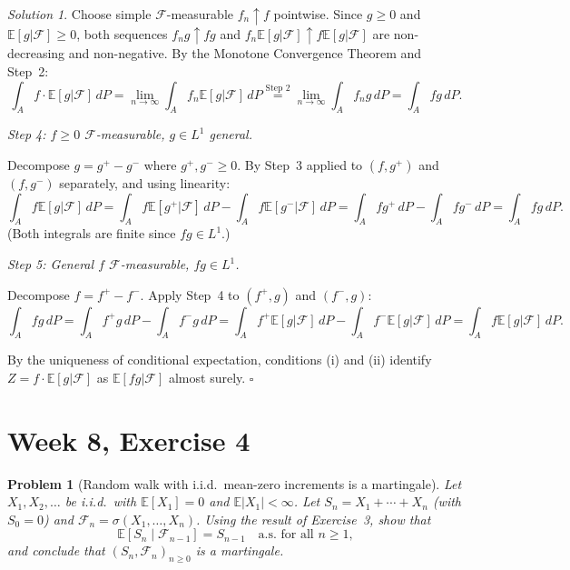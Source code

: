 \documentclass[12pt]{article}
\newtheorem{problem}{Problem}
\theoremstyle{remark}
\newtheorem*{solution}{Solution}
\newcommand{\E}{\mathbb{E}}
\newcommand{\F}{\mathcal{F}}
\newcommand{\1}{\mathbf{1}}
\begin{document}
\begin{solution}
Choose simple $\F$-measurable $f_n \uparrow f$ pointwise.  Since $g \ge 0$ and
$\E[g|\F] \ge 0$, both sequences $f_n g \uparrow fg$ and $f_n \E[g|\F] \uparrow f\E[g|\F]$
are non-decreasing and non-negative.  By the Monotone Convergence Theorem and Step~2:
\[
  \int_A f \cdot \E[g|\F]\,dP
  = \lim_{n\to\infty} \int_A f_n \E[g|\F]\,dP
  \overset{\text{Step }2}{=} \lim_{n\to\infty} \int_A f_n g\,dP
  = \int_A fg\,dP.
\]

\medskip
\noindent\textit{Step 4: $f \ge 0$ $\F$-measurable, $g \in L^1$ general.}

Decompose $g = g^+ - g^-$ where $g^+, g^- \ge 0$.  By Step~3 applied to $(f, g^+)$
and $(f, g^-)$ separately, and using linearity:
\[
  \int_A f \E[g|\F]\,dP
  = \int_A f \E[g^+|\F]\,dP - \int_A f \E[g^-|\F]\,dP
  = \int_A fg^+\,dP - \int_A fg^-\,dP
  = \int_A fg\,dP.
\]
(Both integrals are finite since $fg \in L^1$.)

\medskip
\noindent\textit{Step 5: General $f$ $\F$-measurable, $fg \in L^1$.}

Decompose $f = f^+ - f^-$.  Apply Step~4 to $(f^+, g)$ and $(f^-, g)$:
\[
  \int_A fg\,dP
  = \int_A f^+g\,dP - \int_A f^-g\,dP
  = \int_A f^+\E[g|\F]\,dP - \int_A f^-\E[g|\F]\,dP
  = \int_A f\E[g|\F]\,dP.
\]

By the uniqueness of conditional expectation, conditions (i) and (ii) identify
$Z = f \cdot \E[g|\F]$ as $\E[fg|\F]$ almost surely. \hfill$\square$
\end{solution}

\section*{Week 8, Exercise 4}

\begin{problem}[Random walk with i.i.d.\ mean-zero increments is a martingale]
\label{prob:ex4}
Let $X_1, X_2, \ldots$ be i.i.d.\ with $\E[X_1] = 0$ and $\E|X_1| < \infty$.
Let $S_n = X_1 + \cdots + X_n$ (with $S_0 = 0$) and $\F_n = \sigma(X_1, \ldots, X_n)$.
Using the result of Exercise~3, show that
\[
  \E[S_n \mid \F_{n-1}] = S_{n-1} \quad \text{a.s.\ for all } n \ge 1,
\]
and conclude that $(S_n, \F_n)_{n \ge 0}$ is a martingale.
\end{problem}
\end{document}
